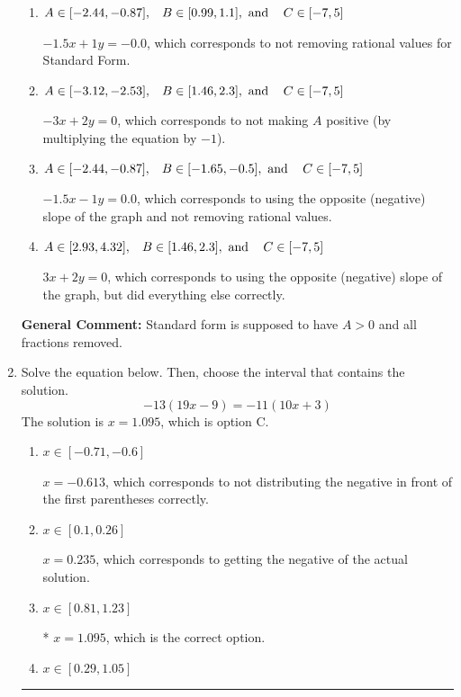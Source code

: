 \documentclass{extbook}[14pt]
\newcommand{\litem}[1]{\item #1

\rule{\textwidth}{0.4pt}}
\begin{document}
\begin{enumerate}
{\begin{enumerate}[label=\Alph*.]
* $3x - 2y = 0$, which is the correct option.
\item \( A \in [-2.44, -0.87], \hspace{3mm} B \in [0.99, 1.1], \text{ and } \hspace{3mm} C \in [-7, 5] \)

 $-1.5x + 1y = -0.0$, which corresponds to not removing rational values for Standard Form.
\item \( A \in [-3.12, -2.53], \hspace{3mm} B \in [1.46, 2.3], \text{ and } \hspace{3mm} C \in [-7, 5] \)

 $-3x + 2y = 0$, which corresponds to not making $A$ positive (by multiplying the equation by $-1$).
\item \( A \in [-2.44, -0.87], \hspace{3mm} B \in [-1.65, -0.5], \text{ and } \hspace{3mm} C \in [-7, 5] \)

 $-1.5x - 1y = 0.0$, which corresponds to using the opposite (negative) slope of the graph and not removing rational values.
\item \( A \in [2.93, 4.32], \hspace{3mm} B \in [1.46, 2.3], \text{ and } \hspace{3mm} C \in [-7, 5] \)

 $3x + 2y = 0$, which corresponds to using the opposite (negative) slope of the graph, but did everything else correctly.
\end{enumerate}

\textbf{General Comment:} Standard form is supposed to have $A > 0$ and all fractions removed.
}
\litem{
Solve the equation below. Then, choose the interval that contains the solution.
\[ -13(19x -9) = -11(10x + 3) \]The solution is \( x = 1.095 \), which is option C.\begin{enumerate}[label=\Alph*.]
\item \( x \in [-0.71, -0.6] \)

$x = -0.613$, which corresponds to not distributing the negative in front of the first parentheses correctly.
\item \( x \in [0.1, 0.26] \)

$x = 0.235$, which corresponds to getting the negative of the actual solution.
\item \( x \in [0.81, 1.23] \)

* $x = 1.095$, which is the correct option.
\item \( x \in [0.29, 1.05] \)


\end{enumerate}}
\end{enumerate}
\end{document}
